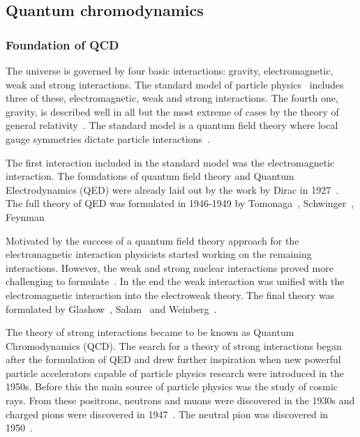 \pagebreak
\subsection{Quantum chromodynamics}
\subsubsection{Foundation of QCD}
The universe is governed by four basic interactions: gravity, electromagnetic, weak and strong interactions. The standard model of particle physics~\cite{Tanabashi:2018oca} includes three of these, electromagnetic, weak and strong interactions.  The fourth one, gravity, is described well in all but the most extreme of cases by the theory of general relativity~\cite{Einstein1915}. The standard model is a quantum field theory where local gauge symmetries dictate  particle interactions~\cite{Perkins:1982xb}. 

The first interaction included in the standard model was the electromagnetic interaction. The foundations of quantum field theory and Quantum Electrodynamics (QED) were already laid out by the work by Dirac in 1927~\cite{doi:10.1098/rspa.1927.0039}. The full theory of QED was formulated in 1946-1949 by Tomonaga~\cite{Tomonaga:1946zz},  Schwinger~\cite{Schwinger:1948yj,Schwinger:1948yk}, Feynman~\cite{Feynman:1948fi}%

Motivated by the success of a quantum field theory approach for the electromagnetic interaction physicists started working on the remaining interactions. However, the weak and strong nuclear interactions proved more challenging to formulate~\cite{Krauss:2017}. In the end the weak interaction was unified with the electromagnetic interaction into the electroweak theory. The final theory was formulated by Glashow~\cite{Glashow:1970gm}, Salam~\cite{Salam:1964ry} and Weinberg~\cite{Weinberg:1967tq}.

The theory of strong interactions became to be known as Quantum Chromodynamics (QCD). The search for a theory of strong interactions began after the formulation of QED and drew further inspiration when new powerful particle accelerators capable of particle physics research were introduced in the 1950s. Before this the main source of particle physics was the study of cosmic rays. From these positrons, neutrons and muons were discovered in the 1930s and charged pions were discovered in 1947~\cite{Occhialini:1987nr,Lattes:1947mx}. The neutral pion was discovered in 1950~\cite{Bjorklund:1950}.

